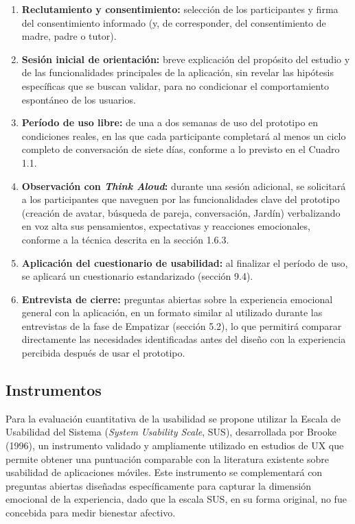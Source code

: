 \begin{enumerate}
    \item \textbf{Reclutamiento y consentimiento:} selección de los participantes y firma del consentimiento informado (y, de corresponder, del consentimiento de madre, padre o tutor).
    \item \textbf{Sesión inicial de orientación:} breve explicación del propósito del estudio y de las funcionalidades principales de la aplicación, sin revelar las hipótesis específicas que se buscan validar, para no condicionar el comportamiento espontáneo de los usuarios.
    \item \textbf{Período de uso libre:} de una a dos semanas de uso del prototipo en condiciones reales, en las que cada participante completará al menos un ciclo completo de conversación de siete días, conforme a lo previsto en el Cuadro 1.1.
    \item \textbf{Observación con \textit{Think Aloud}:} durante una sesión adicional, se solicitará a los participantes que naveguen por las funcionalidades clave del prototipo (creación de avatar, búsqueda de pareja, conversación, Jardín) verbalizando en voz alta sus pensamientos, expectativas y reacciones emocionales, conforme a la técnica descrita en la sección 1.6.3.
    \item \textbf{Aplicación del cuestionario de usabilidad:} al finalizar el período de uso, se aplicará un cuestionario estandarizado (sección 9.4).
    \item \textbf{Entrevista de cierre:} preguntas abiertas sobre la experiencia emocional general con la aplicación, en un formato similar al utilizado durante las entrevistas de la fase de Empatizar (sección 5.2), lo que permitirá comparar directamente las necesidades identificadas antes del diseño con la experiencia percibida después de usar el prototipo.
\end{enumerate}

\subsection{Instrumentos}
Para la evaluación cuantitativa de la usabilidad se propone utilizar la Escala de Usabilidad del Sistema (\textit{System Usability Scale}, SUS), desarrollada por Brooke (1996), un instrumento validado y ampliamente utilizado en estudios de UX que permite obtener una puntuación comparable con la literatura existente sobre usabilidad de aplicaciones móviles. Este instrumento se complementará con preguntas abiertas diseñadas específicamente para capturar la dimensión emocional de la experiencia, dado que la escala SUS, en su forma original, no fue concebida para medir bienestar afectivo.

